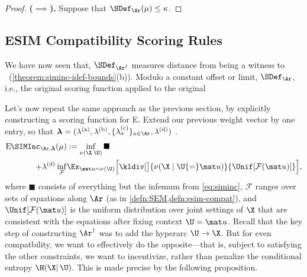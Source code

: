 \begin{subappendices}
{\begin{proof}
    \textbf{($\implies$).}
    Suppose that $\SDef_{\Ar}(\mu) \le \kappa$. 
\end{proof}


\subsection{ESIM Compatibility Scoring Rules}
We have now seen that, $\SDef_{\Ar^\dagger}$ measures distance from 
    being a witness to \scibility\ (\cref{theorem:siminc-idef-bounds}(b)).
Modulo a constant offset or limit, $\SDef_{\Ar}$, i.e., the original scoring function applied to the original \hgraph\ 

Let's now repeat the same approach as the previous section, by explicitly constructing a scoring function for E\scibility.
Extend our previous weight vector by one entry, so that $\boldsymbol\lambda = (\lambda^{\text{(a)}},\lambda^{\text{(b)}},\{\lambda^{\text{(c)}}_a\}_{a \in \Ar}, \lambda^{\text{(d)}})$
\unskip.
%
\begin{align*}
    \mathrm{E}\mskip-1mu\SIMInc_{\Ar, \boldsymbol\lambda}(\mu) 
        &:= 
        \inf_{\nu(\X\!,\,\U)} 
            \blacksquare
        \\ + \lambda^{\text{(d)}}
        \inf_{\mathcal F}& \Ex_{\mat u \sim \nu(\U)}
            \Big[ 
            \kldiv[\big]{ \nu(\X \mid \U{=}\mat u) }{ \Unif[{\mathcal F(\mat u)}] }
            \Big],
\end{align*}
where $\blacksquare$ consists of everything but the infemum from \cref{eq:siminc},
$\mathcal F$ ranges over sets of equations along $\Ar$ (as in \cref{defn:SEM,defn:esim-compat}), and $\Unif[{\mathcal F(\mat u)}]$ is the uniform distribution over joint settings of $\X$ that are consistent with the equations after fixing context $\U = \mat u$. 
Recall that the key step of constructing $\Ar^\dagger$ was to add the hyperarc $\U \to \X$. But for even compatbility, we want to effectively do the opposite---that is, subject to satisfying the other constraints, we want to incentivize, rather than penalize the conditional entropy $\H(\X|\,\U)$. This is made precise by the following proposition.


}
\end{subappendices}
